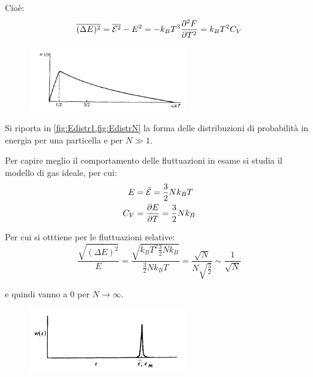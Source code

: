 \begin{description}
	Cioè:
	\begin{equation*}
	\overline{(\Delta E)^2} = \overline{\mathcal{E}^2} - E^2 = - k_B T^3 \frac{\partial {^2 F}}{\partial {T^2}} = k_B T^2 C_V
	\end{equation*}
\end{description}

\begin{figure}[t!]
		\centering
		\includegraphics[width=0.6\textwidth]{Immagini/Edistr1.png}
		\caption{}
		\label{fig:Edistr1}
\end{figure}
Si riporta in \cref{fig:Edistr1,fig:EdistrN} la forma delle distribuzioni di probabilità in energia per una particella e per $N \gg 1$.
\newline

Per capire meglio il comportamento delle fluttuazioni in esame si studia il modello di gas ideale, per cui:
\begin{align*}
E &= \bar{\mathcal{E}} = \frac{3}{2} N k_B T\\
C_V &= \frac{\partial {E}}{\partial {T}} = \frac{3}{2} N k_B
\end{align*}

\noindent Per cui si otttiene per le fluttuazioni relative:
\begin{equation*}
\frac{\sqrt{\overline{(\Delta E)^2}}}{E} = \frac{\sqrt{k_B T^2 \frac{3}{2}Nk_B}}{\frac{3}{2}Nk_B T} = \frac{\sqrt{N}}{N \sqrt{\frac{3}{2}}} \sim \frac{1}{\sqrt{N}}
\end{equation*}

\noindent e quindi vanno a $0$ per $N \rightarrow \infty$.

\begin{figure}[b!]
		\centering
		\includegraphics[width=0.6\textwidth]{Immagini/EdistrN.png}
		\caption{}
		\label{fig:EdistrN}
\end{figure}

